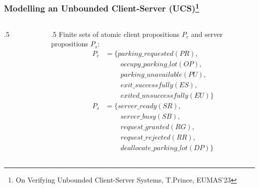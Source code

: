 \documentclass [serif,professionalfont]{beamer}
\newcommand{\iCar}{\raisebox{-0.9\height}{\faCar}}
\begin{document}
\begin{frame}
\end{frame}


\begin{frame}\frametitle{Modelling an Unbounded Client-Server (UCS)\footnote{On Verifying Unbounded Client-Server Systems, T.Prince, EUMAS'23}}
    \begin{columns}[T] %
        \begin{column}{.5\textwidth}
            \begin{figure}
                \begin{center}
                    \scalebox{0.8}{}
                \end{center}
            \end{figure}
        \end{column}
        \hfill
        \begin{column}{.5\textwidth}
            Finite sets of atomic client propositions $P_c$ and server propositions $P_s$:
            \small{
                \begin{align*}
                    P_c
                     & =\{parking\_requested (PR),            \\
                     & \qquad~occupy\_parking\_lot (OP),      \\
                     & \qquad~parking\_unavailable (PU),      \\
                     & \qquad~exit\_successfully (ES),        \\
                     & \qquad~exited\_unsuccessfully (EU)\}   \\
                    P_s
                     & =\{server\_ready (SR),                 \\
                     & \qquad~server\_busy(SB),               \\
                     & \qquad~request\_granted (RG),          \\
                     & \qquad~request\_rejected(RR),          \\
                     & \qquad~deallocate\_parking\_lot (DP)\}
                \end{align*}
            }
        \end{column}%
    \end{columns}
\end{frame}
\end{document}
